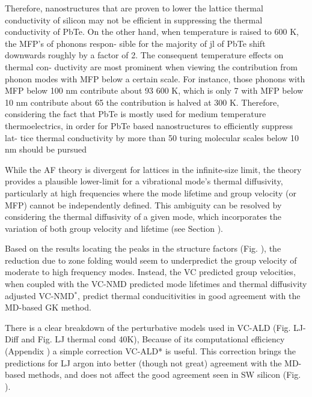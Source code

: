 \documentclass[aps,prb,onecolumn,preprint,superscriptaddress,amsmath,amssymb,floatfix]{revtex4}
\begin{document}
Therefore, nanostructures that are proven to lower
the lattice thermal conductivity of silicon may not be efficient in
suppressing the thermal conductivity of PbTe. On the other hand,
when temperature is raised to 600 K, the MFP’s of phonons respon-
sible for the majority of jl of PbTe shift downwards roughly by a
factor of 2. The consequent temperature effects on thermal con-
ductivity are most prominent when viewing the contribution from
phonon modes with MFP below a certain scale. For instance, those
phonons with MFP below 100 nm contribute about 93%
600 K, which is only 7%
with MFP below 10 nm contribute about 65%
the contribution is halved at 300 K. Therefore, considering the fact
that PbTe is mostly used for medium temperature thermoelectrics,
in order for PbTe based nanostructures to efficiently suppress lat-
tice thermal conductivity by more than 50 %
turing molecular scales below 10 nm should be pursued
\cite{qiu_molecular_2012}




While the AF theory is divergent for lattices in the infinite-size limit, 
the theory provides a plausible lower-limit for a vibrational mode's 
thermal diffusivity, particularly at high frequencies 
where the mode lifetime and group velocity (or MFP) cannot be independently 
defined.\cite{feldman_numerical_1999,xu_energy_2009} 
This ambiguity can be resolved by 
considering the thermal diffusivity of a given mode, which incorporates 
the variation of both group velocity and lifetime (see Section ).

Based on the results locating the peaks in the structure factors 
(Fig. ), the reduction due to zone folding 
would seem to underpredict the group velocity of 
moderate to high frequency modes.\cite{duda_reducing_2011} Instead, 
the VC predicted group velocities, when coupled with the VC-NMD predicted 
mode lifetimes and thermal diffusivity adjusted VC-NMD$^*$, 
predict thermal conducitivities in good agreement with 
the MD-based GK method. 

There is a clear breakdown of the perturbative models used in  
VC-ALD (Fig. LJ-Diff and Fig. LJ thermal cond 40K), 
Because of its computational efficiency (Appendix ) a simple correction 
VC-ALD* is useful. This correction brings the predictions for LJ argon 
into better (though not great) agreement with the MD-based methods, and 
does not affect the good agreement seen in SW silicon (Fig. ). 
\end{document}

